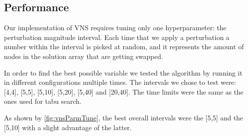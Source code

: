 
\subsection{Performance}

Our implementation of VNS requires tuning only one hyperparameter: the perturbation magnitude interval.
Each time that we apply a perturbation a number within the interval is picked at random, and it represents the amount of nodes in the solution array that are getting swapped.

In order to find the best possible variable we tested the algorithm by running it in different configurations multiple times.
The intervals we chose to test were: [4,4], [5,5], [5,10], [5,20], [5,40] and [20,40].
The time limits were the same as the ones used for tabu search.

As shown by \figurename{ \ref{fig:vnsParmTune}}, the best overall intervals were the [5,5] and the [5,10] with a slight advantage of the latter.

